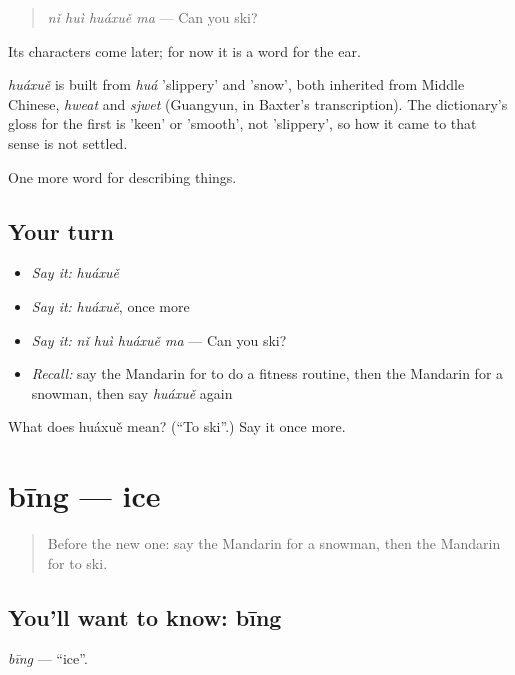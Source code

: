 \begin{quote}
\emph{nǐ huì huáxuě ma} — Can you ski?
\end{quote}

Its characters come later; for now it is a word for the ear.

\begin{cousinweb}
\emph{huáxuě} is built from \emph{huá} 'slippery' and  'snow', both inherited from Middle Chinese, \emph{hweat} and \emph{sjwet} (Guangyun, in Baxter's transcription). The dictionary's gloss for the first is 'keen' or 'smooth', not 'slippery', so how it came to that sense is not settled.
\end{cousinweb}

\begin{grammarlens}[title={What you've built}]
One more word for describing things.
\end{grammarlens}

\subsection*{Your turn}
\begin{itemize}
\raggedright
  \item \emph{Say it:} \emph{huáxuě}
  \item \emph{Say it:} \emph{huáxuě}, once more
  \item \emph{Say it:} \emph{nǐ huì huáxuě ma} — Can you ski?
  \item \emph{Recall:} say the Mandarin for to do a fitness routine, then the Mandarin for a snowman, then say \emph{huáxuě} again
\end{itemize}

\begin{tcolorbox}[breakable,colback=teal!4,colframe=teal!35!black,title={Before you move on}]
What does huáxuě mean? (\textquotedblleft{}To ski\textquotedblright{}.) Say it once more.
\end{tcolorbox}
\section[bīng]{bīng — ice}

\label{lesson:ZH-C221-bing}



\begin{quote}
Before the new one: say the Mandarin for a snowman, then the Mandarin for to ski.
\end{quote}

\subsection*{You'll want to know: bīng}
\emph{bīng} — \textquotedblleft{}ice\textquotedblright{}.

